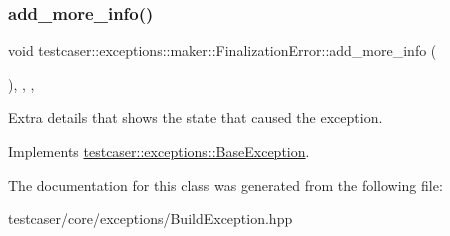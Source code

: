 \subsubsection{\texorpdfstring{add\_more\_info()}{add\_more\_info()}}
{\footnotesize\ttfamily void testcaser\+::exceptions\+::maker\+::\+Finalization\+Error\+::add\+\_\+more\+\_\+info (\begin{DoxyParamCaption}{ }\end{DoxyParamCaption})\hspace{0.3cm}{\ttfamily [inline]}, {\ttfamily [final]}, {\ttfamily [override]}, {\ttfamily [virtual]}}



Extra details that shows the state that caused the exception. 



Implements \mbox{\hyperlink{classtestcaser_1_1exceptions_1_1BaseException_ad607ea04e2cb4ad9b8d0e2e6b6734f2f}{testcaser\+::exceptions\+::\+Base\+Exception}}.



The documentation for this class was generated from the following file\+:\begin{DoxyCompactItemize}
\item 
testcaser/core/exceptions/Build\+Exception.\+hpp\end{DoxyCompactItemize}
